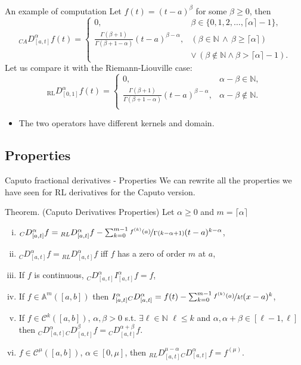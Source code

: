 \documentclass[aspectratio=169,xcolor=dvipsnames]{beamer}
\begin{document}
\begin{frame}{An example of computation}
Let $f(t) = (t-a)^\beta$ for some $\beta \geq 0$, then
\[
{}_{CA}D_{[a,t]}^\alpha f(t) = \begin{cases}
0, & \beta \in \{0,1,2,\ldots,\lceil \alpha \rceil-1\},\\
\frac{\Gamma(\beta + 1)}{\Gamma(\beta +1-\alpha)} (t - a)^{\beta - \alpha}, & (\beta \in \mathbb{N}\,\land\,\beta \geq \lceil \alpha \rceil)\\
& \lor\,(\beta \notin \mathbb{N} \land \beta > \lceil \alpha \rceil - 1).
\end{cases}
\]
Let us compare it with the Riemann-Liouville case:
\[
{}_\text{RL}D_{[0,1]}^\alpha f(t) = \begin{cases}
0, & \alpha-\beta \in \mathbb{N}, \\
\frac{\Gamma(\beta + 1)}{\Gamma(\beta + 1 - \alpha)} (t-a)^{\beta - \alpha}, & \alpha - \beta \notin \mathbb{N}. \\
\end{cases}
\]
\begin{itemize}
	\item[\faExclamation] The two operators have different kernels and domain.
\end{itemize}
\end{frame}

\subsection{Properties}

\begin{frame}{Caputo fractional derivatives - Properties}
We can rewrite all the properties we have seen for RL derivatives for the Caputo version.

\begin{alertblock}{Theorem. (Caputo Derivatives Properties)}
Let $\alpha \geq 0$ and $m = \lceil \alpha \rceil$
\begin{enumerate}[(i)]
\item ${}_{C}{D_{[a,t]}^{\alpha}}f = {}_{RL}{D_{[a,t]}^{\alpha}} f - \sum_{k=0}^{m-1} \nicefrac{ f^{(k)}(a) }{\Gamma(k-\alpha+1)}(t-a)^{k-\alpha}$,  
\item ${}_{C}{D_{[a,t]}^{\alpha}}f = {}_{RL}{D_{[a,t]}^{\alpha}} f$ iff $f$ has a zero of order $m$ at $a$,
\item If $f$ is continuous, $ {}_{C}{D_{[a,t]}^{\alpha}} I_{[a,t]}^{\alpha} f = f$,
\item If $f \in \mathbb{A}^{m}([a,b])$ then $I_{[a,t]}^{\alpha} {}_{C}{D_{[a,t]}^{\alpha}} = f(t) - \sum_{k=0}^{m-1} \nicefrac{f^{(k)}(a)}{k!}(x-a)^k$,
\item If $f \in \mathcal{C}^k([a,b])$, $\alpha,\beta > 0$ s.t. $\exists \ell \in \mathbb{N}$ $\ell \leq k$ and $\alpha,\alpha+\beta \in [\ell-1,\ell]$ then ${}_{C}{D_{[a,t]}^{\alpha}}{}_{C}{D_{[a,t]}^{\beta}} f = {}_{C}{D_{[a,t]}^{\alpha+\beta}}f$.
\item $f \in \mathcal{C}^{\mu}([a,b])$, $\alpha \in [0,\mu]$, then ${}_{RL}{D_{[a,t]}^{\mu - \alpha}} {}_{C}{D_{[a,t]}^{\alpha}} f = f^{(\mu)}$.
\end{enumerate}
\end{alertblock}
\end{frame}
\end{document}
